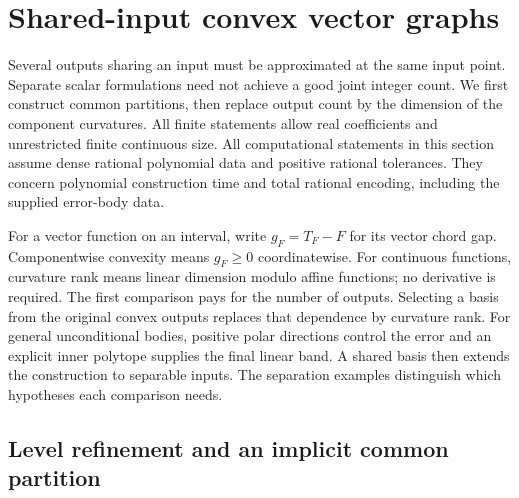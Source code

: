 \section{Shared-input convex vector graphs}\label{sec:vector}

Several outputs sharing an input must be approximated at the same input
point. Separate scalar formulations need not achieve a good joint integer
count. We first construct common partitions, then replace output count by
the dimension of the component curvatures. All finite statements allow
real coefficients and unrestricted finite continuous size. All computational
statements in this section assume dense rational polynomial data and
positive rational tolerances. They concern polynomial construction time
and total rational encoding, including the supplied error-body data.

For a vector function on an interval, write $g_F=T_F-F$ for its vector
chord gap. Componentwise convexity means $g_F\ge0$ coordinatewise.
For continuous functions, curvature rank means linear dimension modulo
affine functions; no derivative is required. The first comparison pays for
the number of outputs. Selecting a basis from the original convex outputs
replaces that dependence by curvature rank. For general unconditional
bodies, positive polar directions control the error and an explicit inner
polytope supplies the final linear band. A shared basis then extends the
construction to separable inputs. The separation examples distinguish
which hypotheses each comparison needs.

\subsection{Level refinement and an implicit common partition}

